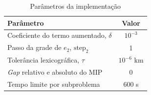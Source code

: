 \documentclass[conference]{IEEEtran}
\begin{document}
\begin{table}[!t]
\renewcommand{\arraystretch}{1.2}
\caption{Parâmetros da implementação}
\label{tab:param}
\centering
\begin{tabular}{lc}
\hline
Parâmetro & Valor\\
\hline
Coeficiente do termo aumentado, $\delta$ & $10^{-3}$\\
Passo da grade de $e_2$, $\text{step}_2$ & 1\\
Tolerância lexicográfica, $\tau$ & $10^{-6}$ km\\
\textit{Gap} relativo e absoluto do MIP & 0\\
Tempo limite por subproblema & 600 s\\
\hline
\end{tabular}
\end{table}

\end{document}
